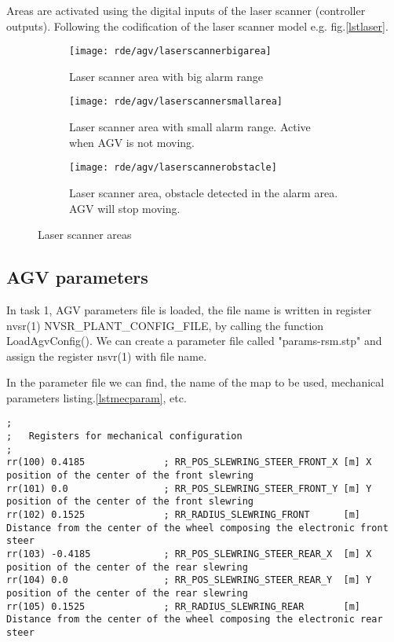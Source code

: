 Areas are activated using the digital inputs of the laser scanner (controller outputs). Following the codification of the laser scanner model e.g. fig.\ref{lstlaser}.

\begin{figure}[h]
	\centering
	\begin{subfigure}{0.4\textwidth}
		\centering
		\texttt{[image: rde/agv/laserscannerbigarea]}
		\caption{Laser scanner area with big alarm range}
		\label{fig:laserscannerbigarea}
	\end{subfigure}
	
	\begin{subfigure}{0.4\textwidth}
		\centering\texttt{[image: rde/agv/laserscannersmallarea]}
		\caption{Laser scanner area with small alarm range. Active when AGV is not moving.}
		\label{fig:laserscannersmallarea}
	\end{subfigure}
	\qquad
	\begin{subfigure}{0.4\textwidth}
		\centering\texttt{[image: rde/agv/laserscannerobstacle]}
		\caption{Laser scanner area, obstacle detected in the alarm area. AGV will stop moving.}
		\label{fig:dispanF6}
	\end{subfigure}
	\label{fig::laserscannerobstacle}
	\caption{Laser scanner areas}
\end{figure}

\subsection{AGV parameters}
In task 1, AGV parameters file is loaded, the file name is written in register nvsr(1) NVSR\_PLANT\_CONFIG\_FILE, by calling the function LoadAgvConfig(). We can create a parameter file called "params-rsm.stp" and assign the register nsvr(1) with file name.

In the parameter file we can find, the name of the map to be used, mechanical parameters listing.\ref{lstmecparam}, etc.

\begin{lstlisting}[caption=params-rsm.stp Mechanical paramter of the AGV, label=lstmecparam]
;
;	Registers for mechanical configuration
;
rr(100)	0.4185				; RR_POS_SLEWRING_STEER_FRONT_X	[m] X position of the center of the front slewring
rr(101) 0.0					; RR_POS_SLEWRING_STEER_FRONT_Y	[m] Y position of the center of the front slewring
rr(102) 0.1525				; RR_RADIUS_SLEWRING_FRONT		[m] Distance from the center of the wheel composing the electronic front steer
rr(103)	-0.4185				; RR_POS_SLEWRING_STEER_REAR_X	[m] X position of the center of the rear slewring
rr(104) 0.0					; RR_POS_SLEWRING_STEER_REAR_Y	[m] Y position of the center of the rear slewring
rr(105) 0.1525				; RR_RADIUS_SLEWRING_REAR		[m] Distance from the center of the wheel composing the electronic rear steer
\end{lstlisting}

